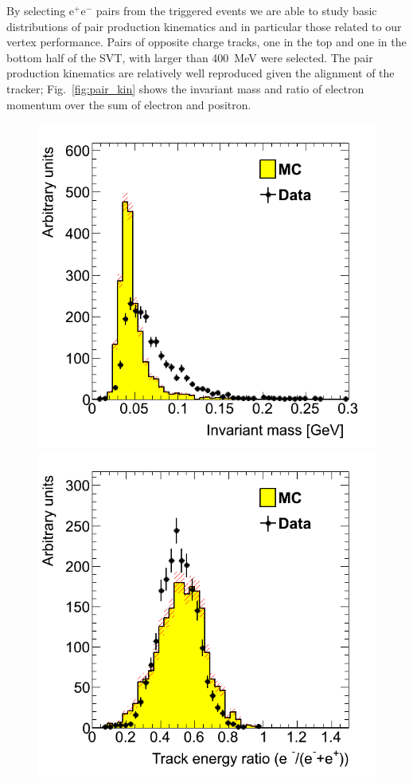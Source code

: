 By selecting e$^{+}$e$^{-}$ pairs from the triggered events we are able to study basic distributions of pair production kinematics and in particular those related to our vertex performance. Pairs of opposite charge tracks, one in the top and one in the bottom half of the SVT, with larger than 400~MeV were selected. The pair production kinematics are relatively well reproduced given the alignment of the tracker; Fig.~\ref{fig:pair_kin} shows the invariant mass and ratio of electron momentum over the sum of electron and positron. 
\begin{figure}[ht]
   \includegraphics[scale=0.25]{test2012/vertexing/figures/h_invM_h_invM_dataMC_0016x0_twotrksel.png}
   \includegraphics[scale=0.25]{test2012/vertexing/figures/h_ratioEsum_h_ratioEsum_dataMC_0016x0_twotrksel.png}

\end{figure}

